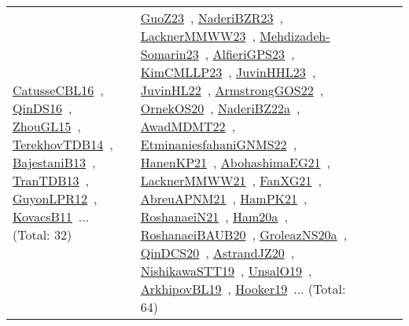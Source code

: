 {\begin{longtable}{lp{3cm}>{\raggedright\arraybackslash}p{6cm}>{\raggedright\arraybackslash}p{6cm}>{\raggedright\arraybackslash}p{8cm}}
\href{../works/CatusseCBL16.pdf}{CatusseCBL16}~\cite{CatusseCBL16}, \href{../works/QinDS16.pdf}{QinDS16}~\cite{QinDS16}, \href{../works/ZhouGL15.pdf}{ZhouGL15}~\cite{ZhouGL15}, \href{../works/TerekhovTDB14.pdf}{TerekhovTDB14}~\cite{TerekhovTDB14}, \href{../works/BajestaniB13.pdf}{BajestaniB13}~\cite{BajestaniB13}, \href{../works/TranTDB13.pdf}{TranTDB13}~\cite{TranTDB13}, \href{../works/GuyonLPR12.pdf}{GuyonLPR12}~\cite{GuyonLPR12}, \href{../works/KovacsB11.pdf}{KovacsB11}~\cite{KovacsB11}... (Total: 32) & \href{../works/GuoZ23.pdf}{GuoZ23}~\cite{GuoZ23}, \href{../works/NaderiBZR23.pdf}{NaderiBZR23}~\cite{NaderiBZR23}, \href{../works/LacknerMMWW23.pdf}{LacknerMMWW23}~\cite{LacknerMMWW23}, \href{../works/Mehdizadeh-Somarin23.pdf}{Mehdizadeh-Somarin23}~\cite{Mehdizadeh-Somarin23}, \href{../works/AlfieriGPS23.pdf}{AlfieriGPS23}~\cite{AlfieriGPS23}, \href{../works/KimCMLLP23.pdf}{KimCMLLP23}~\cite{KimCMLLP23}, \href{../works/JuvinHHL23.pdf}{JuvinHHL23}~\cite{JuvinHHL23}, \href{../works/JuvinHL22.pdf}{JuvinHL22}~\cite{JuvinHL22}, \href{../works/ArmstrongGOS22.pdf}{ArmstrongGOS22}~\cite{ArmstrongGOS22}, \href{../works/OrnekOS20.pdf}{OrnekOS20}~\cite{OrnekOS20}, \href{../works/NaderiBZ22a.pdf}{NaderiBZ22a}~\cite{NaderiBZ22a}, \href{../works/AwadMDMT22.pdf}{AwadMDMT22}~\cite{AwadMDMT22}, \href{../works/EtminaniesfahaniGNMS22.pdf}{EtminaniesfahaniGNMS22}~\cite{EtminaniesfahaniGNMS22}, \href{../works/HanenKP21.pdf}{HanenKP21}~\cite{HanenKP21}, \href{../works/AbohashimaEG21.pdf}{AbohashimaEG21}~\cite{AbohashimaEG21}, \href{../works/LacknerMMWW21.pdf}{LacknerMMWW21}~\cite{LacknerMMWW21}, \href{../works/FanXG21.pdf}{FanXG21}~\cite{FanXG21}, \href{../works/AbreuAPNM21.pdf}{AbreuAPNM21}~\cite{AbreuAPNM21}, \href{../works/HamPK21.pdf}{HamPK21}~\cite{HamPK21}, \href{../works/RoshanaeiN21.pdf}{RoshanaeiN21}~\cite{RoshanaeiN21}, \href{../works/Ham20a.pdf}{Ham20a}~\cite{Ham20a}, \href{../works/RoshanaeiBAUB20.pdf}{RoshanaeiBAUB20}~\cite{RoshanaeiBAUB20}, \href{../works/GroleazNS20a.pdf}{GroleazNS20a}~\cite{GroleazNS20a}, \href{../works/QinDCS20.pdf}{QinDCS20}~\cite{QinDCS20}, \href{../works/AstrandJZ20.pdf}{AstrandJZ20}~\cite{AstrandJZ20}, \href{../works/NishikawaSTT19.pdf}{NishikawaSTT19}~\cite{NishikawaSTT19}, \href{../works/UnsalO19.pdf}{UnsalO19}~\cite{UnsalO19}, \href{../works/ArkhipovBL19.pdf}{ArkhipovBL19}~\cite{ArkhipovBL19}, \href{../works/Hooker19.pdf}{Hooker19}~\cite{Hooker19}... (Total: 64)\\

\end{longtable}}

